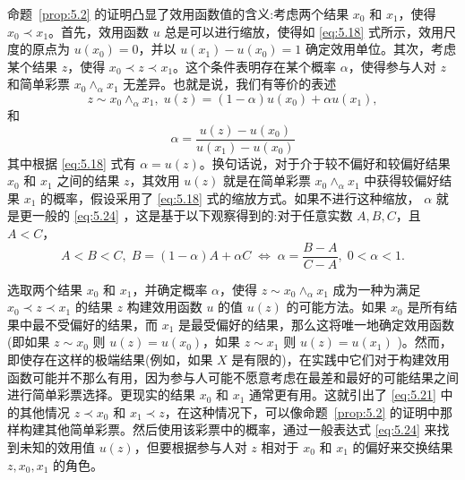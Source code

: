 命题~\ref{prop:5.2} 的证明凸显了效用函数值的含义:考虑两个结果 \({x}_{0}\) 和 \({x}_{1}\)，使得 \({x}_{0} \prec  {x}_{1}\)。首先，效用函数 \(u\) 总是可以进行缩放，使得如 \eqref{eq:5.18} 式所示，效用尺度的原点为 \(u\left( {x}_{0}\right)  = 0\)，并以 \(u\left( {x}_{1}\right)  - u\left( {x}_{0}\right)  = 1\) 确定效用单位。其次，考虑某个结果 \(z\)，使得 \({x}_{0} \prec  z \prec  {x}_{1}\)。这个条件表明存在某个概率 \(\alpha\)，使得参与人对 \(z\) 和简单彩票 \({x}_{0}{ \land  }_{\alpha }{x}_{1}\) 无差异。也就是说，我们有等价的表述
\[
z \sim  {x}_{0}{ \land  }_{\alpha }{x}_{1},\;u\left( z\right)  = \left( {1 - \alpha }\right) u\left( {x}_{0}\right)  + {\alpha u}\left( {x}_{1}\right) ,
\]
和
\begin{equation}
\label{eq:5.24}
\alpha  = \frac{u\left( z\right)  - u\left( {x}_{0}\right) }{u\left( {x}_{1}\right)  - u\left( {x}_{0}\right) }
\end{equation}
其中根据 \eqref{eq:5.18} 式有 \(\alpha  = u\left( z\right)\)。换句话说，对于介于较不偏好和较偏好结果 \({x}_{0}\) 和 \({x}_{1}\) 之间的结果 \(z\)，其效用 \(u\left( z\right)\) 就是在简单彩票 \({x}_{0}{ \land  }_{\alpha }{x}_{1}\) 中获得较偏好结果 \({x}_{1}\) 的概率，假设采用了 \eqref{eq:5.18} 式的缩放方式。如果不进行这种缩放， \(\alpha\) 就是更一般的 \eqref{eq:5.24} ，这是基于以下观察得到的:对于任意实数 \(A,B,C\)，且 \(A < C\)，
\begin{equation}
\label{eq:5.25}
A < B < C,\;B = \left( {1 - \alpha }\right) A + {\alpha C}\; \Leftrightarrow  \;\alpha  = \frac{B - A}{C - A},\;0 < \alpha  < 1.
\end{equation}

选取两个结果 \({x}_{0}\) 和 \({x}_{1}\)，并确定概率 \(\alpha\)，使得 \(z \sim  {x}_{0}{ \land  }_{\alpha }{x}_{1}\) 成为一种为满足 \({x}_{0} \prec  z \prec  {x}_{1}\) 的结果 \(z\) 构建效用函数 \(u\) 的值 \(u\left( z\right)\) 的可能方法。如果 \({x}_{0}\) 是所有结果中最不受偏好的结果，而 \({x}_{1}\) 是最受偏好的结果，那么这将唯一地确定效用函数(即如果 \(z \sim  {x}_{0}\) 则 \(u\left( z\right)  = u\left( {x}_{0}\right)\)，如果 \(z \sim  {x}_{1}\) 则 \(u\left( z\right)  = u\left( {x}_{1}\right)\) )。然而，即使存在这样的极端结果(例如，如果 \(X\) 是有限的)，在实践中它们对于构建效用函数可能并不那么有用，因为参与人可能不愿意考虑在最差和最好的可能结果之间进行简单彩票选择。更现实的结果 \({x}_{0}\) 和 \({x}_{1}\) 通常更有用。这就引出了 \eqref{eq:5.21} 中的其他情况 \(z \prec  {x}_{0}\) 和 \({x}_{1} \prec  z\)，在这种情况下，可以像命题~\ref{prop:5.2} 的证明中那样构建其他简单彩票。然后使用该彩票中的概率，通过一般表达式 \eqref{eq:5.24} 来找到未知的效用值 \(u\left( z\right)\)，但要根据参与人对 \(z\) 相对于 \({x}_{0}\) 和 \({x}_{1}\) 的偏好来交换结果 \(z,{x}_{0},{x}_{1}\) 的角色。

